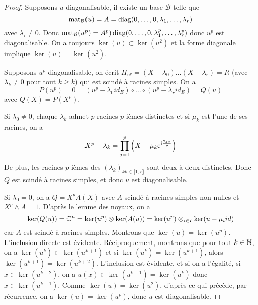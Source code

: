 \documentclass[12pt]{article}
\begin{document}
\begin{proof}
	Supposons $u$ diagonalisable, il existe un base $\mathcal{B}$ telle que 
	\begin{equation}
		\operatorname{mat}_{\mathcal{B}}(u)=A=\operatorname{diag}(0,\dots,0,\lambda_{1},\dots,\lambda_{r})
	\end{equation}
	avec $\lambda_{i}\neq0$. Donc $\operatorname{mat}_{\mathcal{B}}(u^{p})=A^{p})\operatorname{diag}(0,\dots,0,\lambda_{1}^{p},\dots,\lambda_{r}^{p})$ donc $u^{p}$ est diagonalisable. On a toujours $\ker(u)\subset\ker(u^{2})$ et la forme diagonale implique $\ker(u)=\ker(u^{2})$.

	Supposons $u^{p}$ diagonalisable, on écrit $\Pi_{u^{p}}=(X-\lambda_{0})\dots(X-\lambda_{r})=R$ (avec $\lambda_{k}\neq0$ pour tout $k\geqslant k$) qui est scindé à racines simples. On a 
	\begin{equation}
		P(u^{p})=0=(u^{p}-\lambda_{0}id_{E})\circ\dots\circ(u^{p}-\lambda_{r}id_{E})=Q(u)
	\end{equation}
	avec $Q(X)=P(X^{p})$. 

	Si $\lambda_{0}\neq0$, chaque $\lambda_{k}$ admet $p$ racines $p$-ièmes distinctes et si $\mu_{k}$ est l'une de ses racines, on a 
	\begin{equation}
		X^{p}-\lambda_{k}=\prod_{j=1}^{p}\left(X-\mu_{k}\mathrm{e}^{\mathrm{i}\frac{2j\pi}{p}}\right)
	\end{equation}
	De plus, les racines $p$-ièmes des $(\lambda_{k})_{kk\in\llbracket1,r\rrbracket}$ sont deux à deux distinctes. Donc $Q$ est scindé à racines simples, et donc $u$ est diagonalisable.

	Si $\lambda_{0}=0$, on a $Q=X^{p}A(X)$ avec $A$ scindé à racines simples non nulles et $X^{p}\wedge A=1$. D'après le lemme des noyaux, on a 
	\begin{equation}
		\ker(Q(u))=\mathbb{C}^{n}=\ker(u^{p})\otimes\ker(A(u))=\ker(u^{p})\otimes_{i\in I}\ker(u-\mu_{i}id)
	\end{equation}
	car $A$ est scindé à racines simples.
	Montrons que $\ker(u)=\ker(u^{p})$. L'inclusion directe est évidente. Réciproquement, montrons que pour tout $k\in\mathbb{N}$, on a $\ker(u^{k})\subset\ker(u^{k+1})$ et si $\ker(u^{k})=\ker(u^{k+1})$, alors $\ker(u^{k+1})=\ker(u^{k+2})$. L'inclusion est évidente, et si on a l'égalité, si $x\in\ker(u^{k+2})$, on a $u(x)\in\ker(u^{k+1})=\ker(u^{k})$ donc $x\in\ker(u^{k+1})$.
	Comme $\ker(u)=\ker(u^{2})$, d'après ce qui précède, par récurrence, on a $\ker(u)=\ker(u^{p})$, donc $u$ est diagonalisable.
\end{proof}
\end{document}
